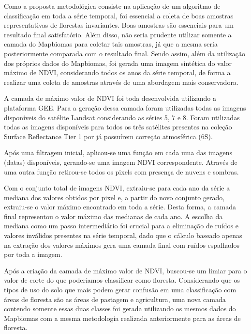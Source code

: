 \documentclass[12pt,a4paper]{article}
\begin{document}
Como a proposta metodológica consiste na aplicação de um algoritmo de classificação em toda a série temporal, foi essencial a coleta de boas amostras representativas de florestas invariantes. Boas amostras são essenciais para um resultado final satisfatório. Além disso, não seria prudente utilizar somente a camada do Mapbiomas para coletar tais amostras, já que a mesma seria posteriormente comparada com o resultado final. Sendo assim, além da utilização dos próprios dados do Mapbiomas, foi gerada uma imagem sintética do valor máximo de NDVI, considerando todos os anos da série temporal, de forma a realizar uma coleta de amostras através de uma abordagem mais conservadora.

A camada de máximo valor de NDVI foi toda desenvolvida utilizando a plataforma GEE. Para a geração dessa camada foram utilizadas todas as imagens disponíveis do satélite Landsat considerando as séries 5, 7 e 8. Foram utilizadas todas as imagens disponíveis para todos os três satélites presentes na coleção Surface Reflectance Tier 1 por já possuírem correção atmosférica (6S).

Após uma filtragem inicial, aplicou-se uma função em cada uma das imagens (datas) disponíveis, gerando-se uma imagem NDVI correspondente. Através de uma outra função retirou-se todos os pixels com presença de nuvens e sombras.

Com o conjunto total de imagens NDVI, extraiu-se para cada ano da série a mediana dos valores obtidos por pixel e, a partir do novo conjunto gerado, extraiu-se o valor máximo encontrado em toda a série. Desta forma, a camada final representou o valor máximo das medianas de cada ano. A escolha da mediana como um passo intermediário foi crucial para a eliminação de ruídos e valores inválidos presentes na série temporal, dado que o cálculo baseado apenas na extração dos valores máximos gera uma camada final com ruídos espalhados por toda a imagem.

Após a criação da camada de máximo valor de NDVI, buscou-se um limiar para o valor de corte do que poderíamos classificar como floresta. Considerando que os tipos de uso do solo que mais podem gerar confusão em uma classificação com áreas de floresta são as áreas de pastagem e agricultura, uma nova camada contendo somente essas duas classes foi gerada utilizando os mesmos dados do Mapbiomas com a mesma metodologia realizada anteriormente para as áreas de floresta.
\end{document}
